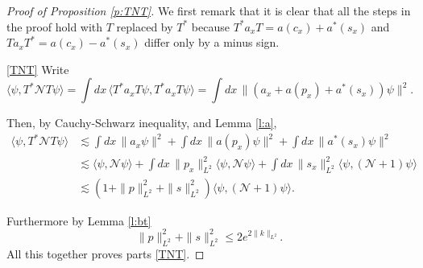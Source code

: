 \documentclass[11pt,a4paper,draft,DIV11]{scrartcl}	%
\newcommand{\N}{\mathcal{N}}
\newcommand{\K}{\mathcal{K}}
\begin{document}
\begin{proof}[Proof of Proposition \ref{p:TNT}]
  We first remark that it is clear that all the steps in the proof hold with
  $T$ replaced by $T^*$ because $T^* a_x T = a(c_x) + a^*(s_x)$ and $T a_x T^*
  = a(c_x) - a^*(s_x)$ differ only by a minus sign.


  \eqref{TNT} Write
  \[
    \langle \psi, T^* \N T \psi \rangle = \int dx \, \langle T^* a_x T \psi,
    T^* a_x T \psi \rangle = \int dx \, \| (a_x + a(p_x) + a^*(s_x)) \psi
    \|^2.
  \]
  \iffalse and
  \[
    \langle \psi, T^* \K T \psi \rangle = \int dx \, \langle T^* \nabla_x a_x
    T \psi, T^* \nabla_x a_x T \psi \rangle = \int dx \, \| (\nabla a_x +
    a(\nabla_x p_x) + a^*(\nabla_x s_x)) \psi \|^2.
  \]\fi
  Then, by Cauchy-Schwarz inequality, and Lemma \ref{l:a},
  \begin{align*}
    \langle \psi, T^* \N T \psi \rangle & \apprle \int dx \, \| a_x \psi \|^2
    + \int dx \, \| a(p_x) \psi \|^2 + \int dx \, \| a^*(s_x) \psi \|^2 \\
    & \apprle \langle \psi, \N \psi \rangle + \int dx \, \| p_x \|_{L^2}^2
    \langle \psi, \N \psi \rangle + \int dx \, \| s_x \|_{L^2}^2 \langle
    \psi, (\N+1) \psi \rangle \\
    & \apprle (1 + \| p \|_{L^2}^2 + \| s \|_{L^2}^2) \langle \psi, (\N+1) \psi
    \rangle.
  \end{align*}
  \iffalse and
  \begin{align*}
    \langle \psi, T^* \K T \psi \rangle & \apprle \int dx \, \| \nabla_x a_x
    \psi \|^2 + \int dx \, \| a(\nabla_x p_x) \psi \|^2 + \int dx \, \|
    a^*(\nabla_x s_x) \psi \|^2 \\
    & = \langle \psi, \K \psi \rangle + \int dx \, \| a(\nabla_x p_x) \psi
    \|^2 + \int dx \, \| a(\nabla_x s_x) \psi \|^2 + \| \nabla_2 s \|_{L^2}^2
    \\
    & \apprle (1 + \| p \|_{L^2}^2 + \| s \|_{L^2}^2) \langle \psi, \K \psi
    \rangle + \| \nabla_2 s \|_{L^2}^2.
  \end{align*}\fi
  Furthermore by Lemma \ref{l:bt}
  \begin{equation} \label{c1}
    \| p \|_{L^2}^2 + \| s \|_{L^2}^2 \le 2 e^{2 \| k \|_{L^2}}.%
  \end{equation}
  All this together proves parts \eqref{TNT}.
  


\end{proof}
\end{document}
